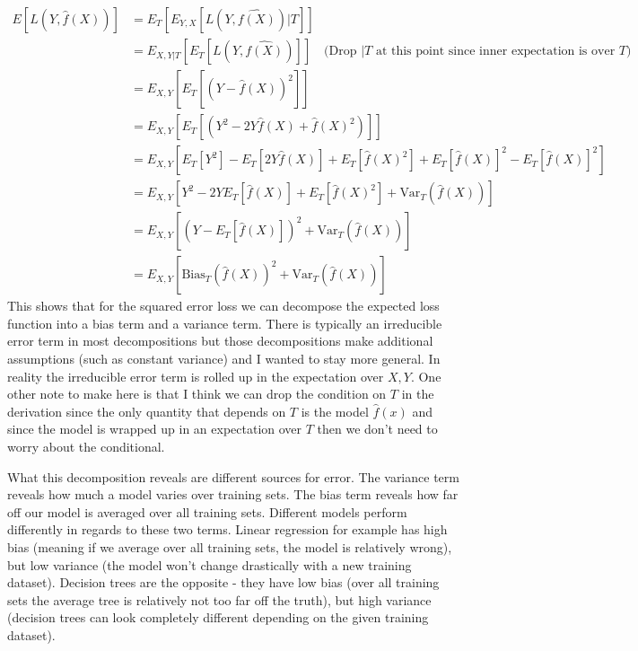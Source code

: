 \begin{equation}
\begin{split}
E[L(Y, \hat{f}(X))] & = E_{T}[E_{Y,X}[L(Y, \hat{f(X)})|T]] \\
&= E_{X,Y|T}[E_{T}[L(Y, \hat{f(X)})]]  \quad \text{(Drop $|T$ at this point since inner expectation is over $T$)}\\
&= E_{X,Y}[E_{T}[(Y - \hat{f}(X))^2]] \\
&= E_{X,Y}[E_{T}[(Y^2 - 2Y\hat{f}(X) + \hat{f}(X)^2)]] \\
&= E_{X,Y}[E_{T}[Y^2] - E_{T}[2Y\hat{f}(X)] + E_{T}[\hat{f}(X)^2] + E_{T}[\hat{f}(X)]^2 - E_{T}[\hat{f}(X)]^2]\\
&= E_{X,Y}[Y^2 -  2YE_{T}[\hat{f}(X)] + E_{T}[\hat{f}(X)^2] + \text{Var}_{T}(\hat{f}(X))]\\
&=E_{X,Y}[(Y - E_{T}[\hat{f}(X)])^2 + \text{Var}_{T}(\hat{f}(X))] \\
&= E_{X,Y}[\text{Bias}_{T}(\hat{f}(X))^2 + \text{Var}_{T}(\hat{f}(X))] 
\end{split}
\end{equation}
This shows that for the squared error loss we can decompose the expected loss function into a bias term and a variance term. There is typically an irreducible error term in most decompositions but those decompositions make additional assumptions (such as constant variance) and I wanted to stay more general. In reality the irreducible error term is rolled up in the expectation over $X,Y$. One other note to make here is that I think we can drop the condition on $T$ in the derivation since the only quantity that depends on $T$ is the model $\hat{f}(x)$ and since the model is wrapped up in an expectation over $T$ then we don't need to worry about the conditional.

What this decomposition reveals are different sources for error. The variance term reveals how much a model varies over training sets. The bias term reveals how far off our model is averaged over all training sets. Different models perform differently in regards to these two terms. Linear regression for example has high bias (meaning if we average over all training sets, the model is relatively wrong), but low variance (the model won't change drastically with a new training dataset). Decision trees are the opposite - they have low bias (over all training sets the average tree is relatively not too far off the truth), but high variance (decision trees can look completely different depending on the given training dataset).

